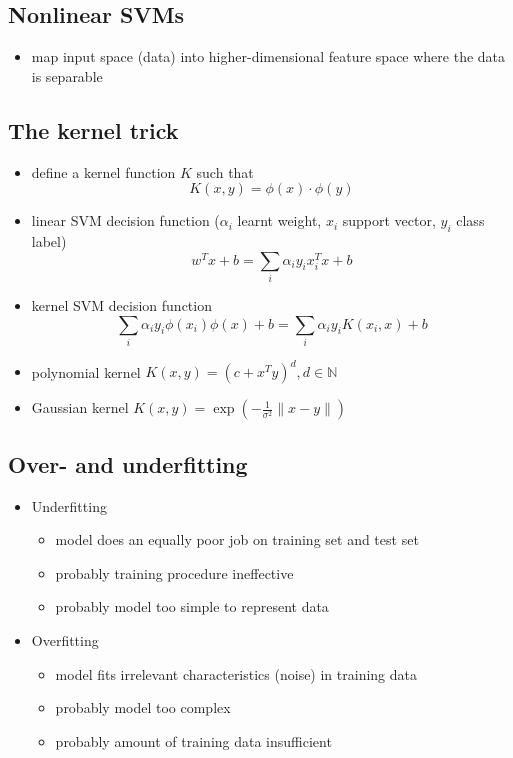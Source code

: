 \documentclass[12pt]{article}
\begin{document}
	\subsection{Nonlinear SVMs}
	\begin{itemize}
		\item map input space (data) into higher-dimensional feature space where the data is separable
	\end{itemize}

	\subsection{The kernel trick}
	\begin{itemize}
		\item define a kernel function $K$ such that
			\begin{equation}
				K(x,y) = \phi(x)\cdot\phi(y)
			\end{equation}
		\item linear SVM decision function ($\alpha_i$ learnt weight, $x_i$ support vector, $y_i$ class label)
			\begin{equation}
				w^Tx + b = \sum_i \alpha_i y_ix_i^Tx + b
			\end{equation}
		\item kernel SVM decision function
			\begin{equation}
				\sum_i \alpha_i y_i\phi(x_i)\phi(x) + b = \sum_i \alpha_i y_i K(x_i,x) + b
			\end{equation}
		\item polynomial kernel $K(x,y) = (c + x^Ty)^d, d \in  \mathbb{N}$
		\item Gaussian kernel $K(x,y) = \exp( - \frac{1}{\sigma^2} \|x-y\|)$
	\end{itemize}

	\subsection{Over- and underfitting}
	\begin{itemize}
		\item Underfitting
			\begin{itemize}
				\item model does an equally poor job on training set and test set
				\item probably training procedure ineffective
				\item probably model too simple to represent data
			\end{itemize}
		\item Overfitting
			\begin{itemize}
				\item model fits irrelevant characteristics (noise) in training data
				\item probably model too complex
				\item probably amount of training data insufficient
			\end{itemize}
	\end{itemize}
\end{document}
